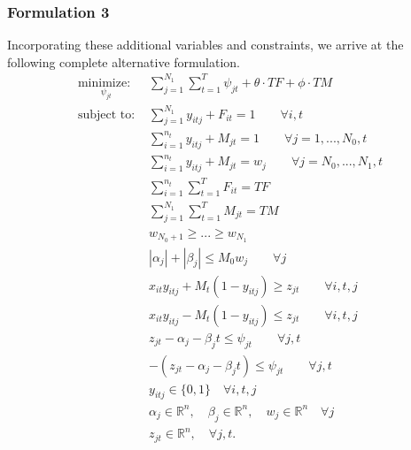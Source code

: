 \subsubsection{Formulation 3}
Incorporating these additional variables and constraints, we arrive at the following complete alternative formulation.
\begin{align}
\underset{\psi_{jt}}{\text{minimize: }} & \sum_{j=1}^{N_{1}} \sum_{t=1}^{T} \psi_{jt} + \theta \cdot TF + \phi \cdot TM\\
\text{subject to: }	& \sum_{j=1}^{N_{1}} y_{itj} + F_{it} = 1 \qquad \forall i,t \nonumber\\
				& \sum_{i=1}^{n_{t}} y_{itj} + M_{jt} = 1 \qquad \forall j=1,...,N_{0},t \nonumber \\
				& \sum_{i=1}^{n_{t}} y_{itj} + M_{jt} = w_{j} \qquad \forall j=N_{0},...,N_{1},t \nonumber \\
				& \sum_{i=1}^{n_{t}} \sum_{t=1}^{T} F_{it} = TF \nonumber \\
				& \sum_{j=1}^{N_{1}} \sum_{t=1}^{T} M_{jt} = TM \nonumber \\
				& w_{N_0+1}\geq ...\geq w_{N_1} \nonumber \\
				& |\alpha_{j}|+|\beta_{j}| \leq M_{0}w_{j}\qquad \forall j \nonumber \\
				& x_{it}y_{itj} + M_{t}(1-y_{itj}) \geq z_{jt} \qquad \forall i,t,j \nonumber \\
				& x_{it}y_{itj} - M_{t}(1-y_{itj}) \leq z_{jt} \qquad \forall i,t,j \nonumber \\
				& z_{jt} - \alpha_{j} - \beta_{j}t \leq \psi_{jt} \qquad \forall j,t \nonumber \\
				& -(z_{jt} - \alpha_{j} - \beta_{j}t) \leq \psi_{jt} \qquad \forall j,t \nonumber \\
			 	& y_{itj} \in \{0,1\} \quad \forall i,t,j \nonumber \\
				& \alpha_{j} \in \mathbb{R}^n,\quad \beta_{j} \in \mathbb{R}^n,\quad w_{j} \in \mathbb{R}^n \quad \forall j \nonumber \\
				& z_{jt} \in \mathbb{R}^n, \quad \forall j,t. \nonumber
\end{align}

